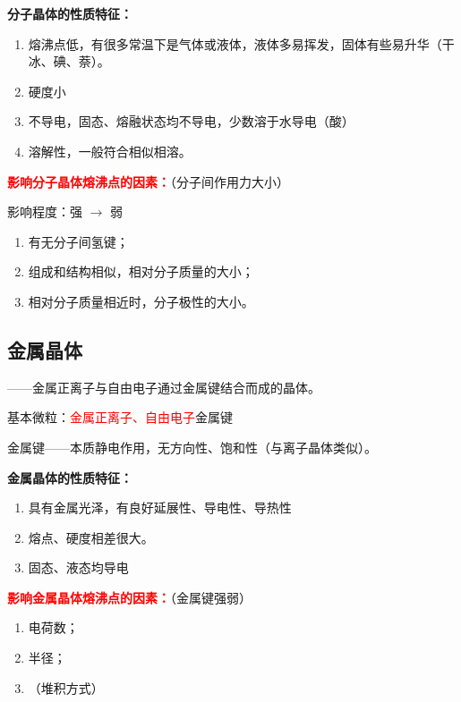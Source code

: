             \textbf{分子晶体的性质特征：}

            \begin{enumerate}
                \item 熔沸点低，有很多常温下是气体或液体，液体多易挥发，固体有些易升华（干冰、碘、萘）。
                \item 硬度小
                \item 不导电，固态、熔融状态均不导电，少数溶于水导电（酸）
                \item 溶解性，一般符合相似相溶。
            \end{enumerate}

            \textbf{\textcolor{red}{影响分子晶体熔沸点的因素：}}（分子间作用力大小）

            影响程度：强 \(\to\) 弱

            \begin{enumerate}
                \item 有无分子间氢键；
                \item 组成和结构相似，相对分子质量的大小；
                \item 相对分子质量相近时，分子极性的大小。
            \end{enumerate}

        \subsection{金属晶体}\label{subsec:金属晶体}

            ——金属正离子与自由电子通过金属键结合而成的晶体。

            基本微粒：\textcolor{red}{金属正离子、自由电子}\qquad 金属键

            金属键——本质静电作用，无方向性、饱和性（与离子晶体类似）。

            \textbf{金属晶体的性质特征：}

            \begin{enumerate}
                \item 具有金属光泽，有良好延展性、导电性、导热性
                \item 熔点、硬度相差很大。
                \item 固态、液态均导电
            \end{enumerate}

            \textbf{\textcolor{red}{影响金属晶体熔沸点的因素：}}（金属键强弱）

            \begin{enumerate}
                \item 电荷数；
                \item 半径；
                \item（堆积方式）
            \end{enumerate}

